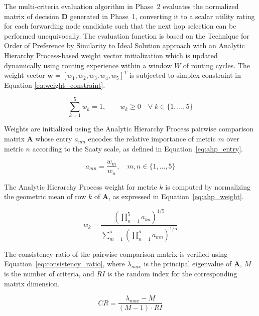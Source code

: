 \documentclass[a4paper,fleqn]{cas-dc}
\numberwithin{equation}{section}
\begin{document}
The multi-criteria evaluation algorithm in Phase~2 evaluates the normalized
matrix of decision $\mathbf{D}$ generated in Phase~1, converting it to a
scalar utility rating for each forwarding node candidate such that
the next hop selection can be performed unequivocally.\cite{R9_Tumula2025OptimizingIoTSDNBlockchain,HaddadPajouh2019SurveyIoTSecurity}
The evaluation function is based on the Technique for Order of
Preference by Similarity to Ideal Solution approach with an
Analytic Hierarchy Process-based weight vector initialization which is
updated dynamically using routing experience within a window $W$ of
routing cycles. The weight vector $\mathbf{w} = [w_1, w_2, w_3,
w_4, w_5]^T$ is subjected to simplex constraint in Equation
\ref{eq:weight_constraint}.

\begin{equation}
\label{eq:weight_constraint}
\sum_{k=1}^{5} w_k = 1, \qquad w_k \geq 0
\quad \forall \; k \in \{1,\ldots,5\}
\end{equation}

Weights are initialized using the Analytic Hierarchy Process pairwise
comparison matrix $\mathbf{A}$ whose entry $a_{mn}$ encodes the
relative importance of metric $m$ over metric $n$ according to the
Saaty scale, as defined in Equation~\ref{eq:ahp_entry}.

\begin{equation}
\label{eq:ahp_entry}
a_{mn} = \frac{w_m}{w_n}, \quad m,n \in \{1,\ldots,5\}
\end{equation}

The Analytic Hierarchy Process weight for metric $k$ is computed by
normalizing the geometric mean of row $k$ of $\mathbf{A}$, as
expressed in Equation~\ref{eq:ahp_weight}.

\begin{equation}
\label{eq:ahp_weight}
w_k = \frac{\left(\prod_{n=1}^{5} a_{kn}\right)^{1/5}}
           {\displaystyle\sum_{m=1}^{5}
           \left(\prod_{n=1}^{5} a_{mn}\right)^{1/5}}
\end{equation}

The consistency ratio of the pairwise comparison matrix is verified
using Equation~\ref{eq:consistency_ratio}, where $\lambda_{max}$ is
the principal eigenvalue of $\mathbf{A}$, $M$ is the number of
criteria, and $RI$ is the random index for the corresponding matrix
dimension.

\begin{equation}
\label{eq:consistency_ratio}
CR = \frac{\lambda_{max} - M}{(M - 1) \cdot RI}
\end{equation}
\end{document}
